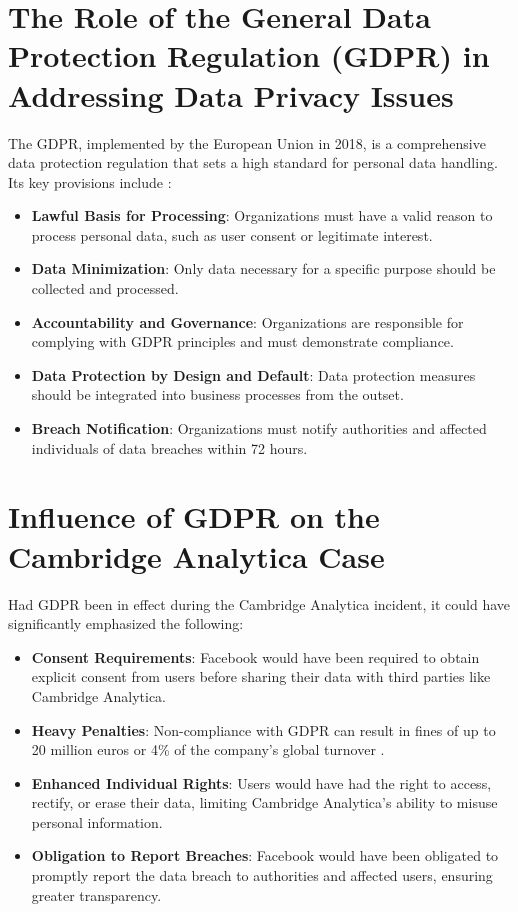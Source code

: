 \documentclass[12pt]{article}
\begin{document}
\section{The Role of the General Data Protection Regulation (GDPR) in Addressing Data Privacy Issues}
The GDPR, implemented by the European Union in 2018, is a comprehensive data protection regulation that sets a high standard for personal data handling. Its key provisions include \cite{gdpr2018}:
\begin{itemize}
    \item \textbf{Lawful Basis for Processing}: Organizations must have a valid reason to process personal data, such as user consent or legitimate interest.
    \item \textbf{Data Minimization}: Only data necessary for a specific purpose should be collected and processed.
    \item \textbf{Accountability and Governance}: Organizations are responsible for complying with GDPR principles and must demonstrate compliance.
    \item \textbf{Data Protection by Design and Default}: Data protection measures should be integrated into business processes from the outset.
    \item \textbf{Breach Notification}: Organizations must notify authorities and affected individuals of data breaches within 72 hours.
\end{itemize}

\section{Influence of GDPR \cite{regulation2016regulation} on the Cambridge Analytica Case}
Had GDPR been in effect during the Cambridge Analytica incident, it could have significantly emphasized the following:
\begin{itemize}
    \item \textbf{Consent Requirements}: Facebook would have been required to obtain explicit consent from users before sharing their data with third parties like Cambridge Analytica.
    \item \textbf{Heavy Penalties}: Non-compliance with GDPR can result in fines of up to 20 million euros or 4\% of the company’s global turnover \cite{gdprpenalties}.
    \item \textbf{Enhanced Individual Rights}: Users would have had the right to access, rectify, or erase their data, limiting Cambridge Analytica’s ability to misuse personal information.
    \item \textbf{Obligation to Report Breaches}: Facebook would have been obligated to promptly report the data breach to authorities and affected users, ensuring greater transparency.
\end{itemize}



\end{document}
